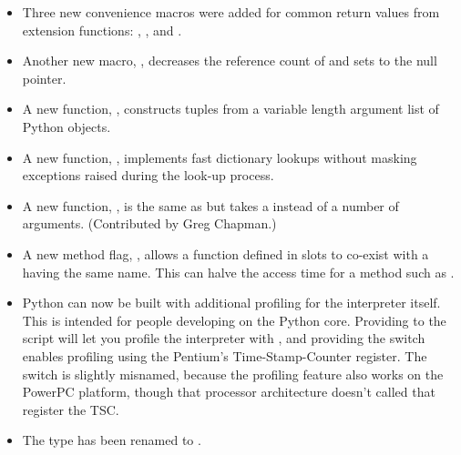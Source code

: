 \documentclass{howto}
\begin{document}
\begin{itemize}

  \item Three new convenience macros were added for common return
  values from extension functions: ,
  , and .

  \item Another new macro, , 
  decreases the reference count of  and sets  to the
  null pointer.

  \item A new function, , constructs tuples from a variable
  length argument list of Python objects.

  \item A new function, ,
  implements fast dictionary lookups without masking exceptions raised
  during the look-up process.

  \item A new function, ,
  is the same as  but takes a 
   instead of a number of arguments.
  (Contributed by Greg Chapman.)

  \item A new method flag, , allows a function
  defined in slots to co-exist with a  having the
  same name.  This can halve the access time for a method such as
  .

  \item Python can now be built with additional profiling for the
  interpreter itself.  This is intended for people developing on the
  Python core.  Providing  to the
   script will let you profile the interpreter with
  , and providing the 
  switch enables profiling using the Pentium's Time-Stamp-Counter
  register.  The switch is slightly misnamed, because the profiling
  feature also works on the PowerPC platform, though that processor
  architecture doesn't called that register the TSC.
   
  \item The  type has been renamed to .

\end{itemize}
\end{document}
